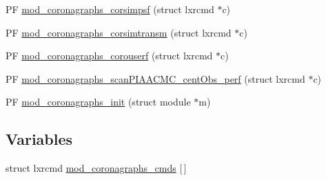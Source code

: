 \begin{DoxyCompactItemize}
\item 
P\+F \hyperlink{coronagraphs-util_8c_a2c2a5519f28390c6681c02a74ac85c1c}{mod\+\_\+coronagraphs\+\_\+corsimpsf} (struct lxrcmd $\ast$c)
\item 
P\+F \hyperlink{coronagraphs-util_8c_a64f8790624a00f66c0909931f9b59fd1}{mod\+\_\+coronagraphs\+\_\+corsimtransm} (struct lxrcmd $\ast$c)
\item 
P\+F \hyperlink{coronagraphs-util_8c_abbb1d233077de55b9998a8ecf194f5ba}{mod\+\_\+coronagraphs\+\_\+corouserf} (struct lxrcmd $\ast$c)
\item 
P\+F \hyperlink{coronagraphs-util_8c_ad184c4a7b3e1b50678d6dac5953a2a1c}{mod\+\_\+coronagraphs\+\_\+scan\+P\+I\+A\+A\+C\+M\+C\+\_\+cent\+Obs\+\_\+perf} (struct lxrcmd $\ast$c)
\item 
P\+F \hyperlink{coronagraphs-util_8c_a72e1df16f2ec59428dbded2069869359}{mod\+\_\+coronagraphs\+\_\+init} (struct module $\ast$m)
\end{DoxyCompactItemize}
\subsection*{Variables}
\begin{DoxyCompactItemize}
\item 
struct lxrcmd \hyperlink{coronagraphs-util_8c_a1d7b5c14afe6db43c68aa98a53de63c0}{mod\+\_\+coronagraphs\+\_\+cmds} \mbox{[}$\,$\mbox{]}
\end{DoxyCompactItemize}


